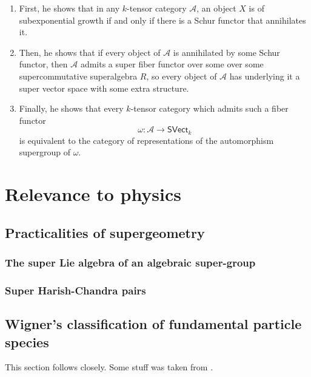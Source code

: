 \documentclass[a4paper,10pt]{scrreprt}
\theoremstyle{definition}
\theoremstyle{plain}
\theoremstyle{remark}
\begin{document}
\begin{enumerate}
  \item \label{item:proofsketch1} First, he shows that in any $k$-tensor category $\mathscr{A}$, an object $X$ is of subexponential growth if and only if there is a Schur functor that annihilates it.

  \item \label{item:proofsketch2} Then, he shows that if every object of $\mathscr{A}$ is annihilated by some Schur functor, then $\mathscr{A}$ admits a super fiber functor over some over some supercommutative superalgebra $R$, so every object of $\mathscr{A}$ has underlying it a super vector space with some extra structure.

  \item \label{item:proofsketch3} Finally, he shows that every $k$-tensor category which admits such a fiber functor 
    \begin{equation*}
      \omega\colon \mathscr{A} \to \mathsf{SVect}_{k}
    \end{equation*}
    is equivalent to the category of representations of the automorphism supergroup of $\omega$.
\end{enumerate}

\chapter{Relevance to physics}
\section{Practicalities of supergeometry}
\subsection{The super Lie algebra of an algebraic super-group}

\subsection{Super Harish-Chandra pairs}


\section{Wigner's classification of fundamental particle species}
This section follows \cite{haag-local-quantum-physics} closely. Some stuff was taken from \cite{sexl-urbantke-relativity-groups-particles}.
\end{document}
